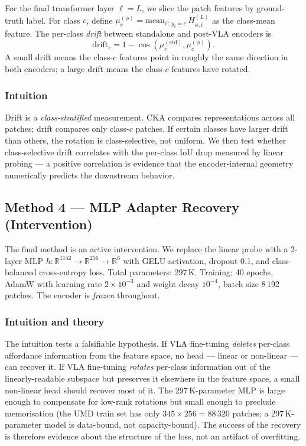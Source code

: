 \documentclass[11pt]{article}
\begin{document}
For the final transformer layer $\ell = L$, we slice the patch features
by ground-truth label. For class $c$, define
$\mu_c^{(\phi)} = \mathrm{mean}_{i\,:\, y_i = c}\, H^{(L)}_{\phi, i}$ as
the class-mean feature. The per-class \emph{drift} between standalone
and post-VLA encoders is
\[
\mathrm{drift}_c = 1 - \cos\!\left(\mu_c^{(\mathrm{std})}, \mu_c^{(\phi)}\right).
\]
A small drift means the class-$c$ features point in roughly the same
direction in both encoders; a large drift means the class-$c$ features
have rotated.

\subsubsection{Intuition}

Drift is a \emph{class-stratified} measurement. CKA compares
representations across all patches; drift compares only
class-$c$ patches. If certain classes have larger drift than others,
the rotation is class-selective, not uniform. We then test whether
class-selective drift correlates with the per-class IoU drop measured
by linear probing --- a positive correlation is evidence that the
encoder-internal geometry numerically predicts the downstream behavior.

\subsection{Method 4 --- MLP Adapter Recovery (Intervention)}

The final method is an active intervention. We replace the linear
probe with a 2-layer MLP $h: \mathbb{R}^{1152} \to \mathbb{R}^{256} \to
\mathbb{R}^{6}$ with GELU activation, dropout 0.1, and class-balanced
cross-entropy loss. Total parameters: 297\,K. Training: 40 epochs,
AdamW with learning rate $2 \times 10^{-3}$ and weight decay $10^{-4}$,
batch size 8\,192 patches. The encoder is \emph{frozen} throughout.

\subsubsection{Intuition and theory}

The intuition tests a falsifiable hypothesis. If VLA fine-tuning
\emph{deletes} per-class affordance information from the feature space,
no head --- linear or non-linear --- can recover it. If VLA fine-tuning
\emph{rotates} per-class information out of the linearly-readable
subspace but preserves it elsewhere in the feature space, a small
non-linear head should recover most of it. The 297\,K-parameter MLP is
large enough to compensate for low-rank rotations but small enough to
preclude memorisation (the UMD train set has only $345 \times 256 =
88\,320$ patches; a 297\,K-parameter model is data-bound, not
capacity-bound). The success of the recovery is therefore evidence
about the structure of the loss, not an artifact of overfitting.
\end{document}
